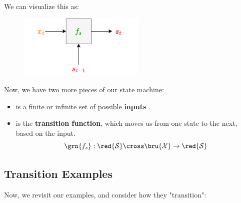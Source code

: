         We can visualize this as:
    
        \begin{figure}[H]
            \centering
            \includegraphics[width=60mm,scale=0.4]{images/rnn_images/transition_diagram.png}
        \end{figure}

        Now, we have two more pieces of our state machine:
        
        \begin{itemize}
            \item {} is a finite or infinite set of possible \textbf{inputs} .
            \item {} is the \textbf{transition function}, which moves us from one state to the next, based on the input.
                \begin{equation}
                    \grn{f_s}: \red{\mathcal{S}} \cross \bru{\mathcal{X}} 
                    \rightarrow \red{\mathcal{S}}
                \end{equation}
        \end{itemize}

    \subsection{Transition Examples}
        
        Now, we revisit our examples, and consider how they "transition":
        
